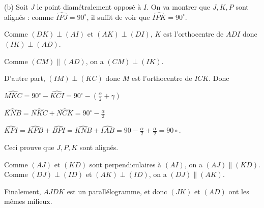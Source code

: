 \begin{sol}
 (b) Soit $J$ le point diam\'etralement oppos\'e \`a $I$. On va montrer que $J,K,P$ sont align\'es : comme $\widehat{IPJ}=90^\circ$, il suffit de voir que $\widehat{IPK}=90^\circ$.

Comme $(DK)\perp (AI)$ et $(AK)\perp (DI)$, $K$ est l'orthocentre de $ADI$ donc $(IK)\perp (AD)$.

Comme $(CM)\parallel (AD)$, on a $(CM)\perp (IK)$.

D'autre part, $(IM)\perp (KC)$ donc $M$ est l'orthocentre de $ICK$. Donc

$\widehat{MKC}=90^\circ-\widehat{KCI}=90^\circ-(\frac{\alpha}{2}+\gamma)$

$\widehat{KNB}=\widehat{NKC}+\widehat{NCK}=90^\circ-\frac{\alpha}{2}$

$\widehat{KPI}=\widehat{KPB}+\widehat{BPI}=\widehat{KNB}+\widehat{IAB}=90-\frac{\alpha}{2}+\frac{\alpha}{2}=90\circ$.

Ceci prouve que $J,P,K$ sont align\'es.

Comme $(AJ)$ et $(KD)$ sont perpendiculaires \`a $(AI)$, on a $(AJ)\parallel (KD)$. Comme $(DJ)\perp (ID)$ et $(AK)\perp (ID)$, on a $(DJ)\parallel (AK)$.

Finalement, $AJDK$ est un parall\'elogramme, et donc $(JK)$ et $(AD)$ ont les m\^emes milieux.
\end{sol}

% 
% 
